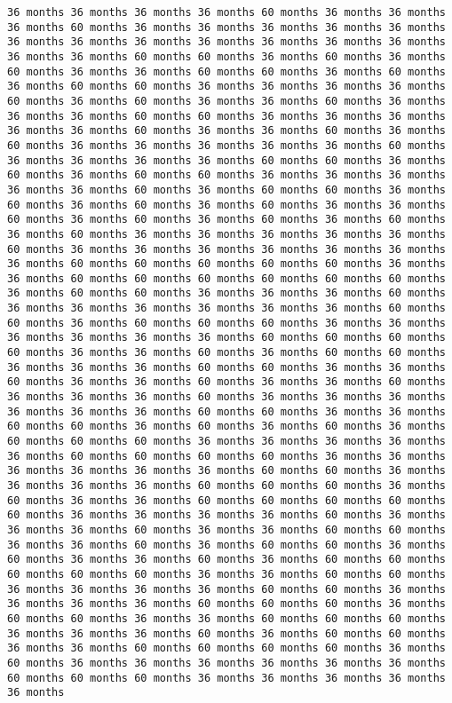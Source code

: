 \documentclass[11pt]{article}
\begin{document}
\begin{Verbatim}[commandchars=\\\{\}, frame=single, framerule=2mm, rulecolor=\color{outerrorbackground}]
36 months 36 months 36 months 36 months 60 months 36 months 36 months 36 months 60 months 36 months 36 months 36 months 36 months 36 months 36 months 36 months 36 months 36 months 36 months 36 months 36 months 36 months 36 months 60 months 60 months 36 months 60 months 36 months 60 months 36 months 36 months 60 months 60 months 36 months 60 months 36 months 60 months 60 months 36 months 36 months 36 months 36 months 60 months 36 months 60 months 36 months 36 months 60 months 36 months 36 months 36 months 60 months 60 months 36 months 36 months 36 months 36 months 36 months 60 months 36 months 36 months 60 months 36 months 60 months 36 months 36 months 36 months 36 months 36 months 60 months 36 months 36 months 36 months 36 months 60 months 60 months 36 months 60 months 36 months 60 months 60 months 36 months 36 months 36 months 36 months 36 months 60 months 36 months 60 months 60 months 36 months 60 months 36 months 60 months 36 months 60 months 36 months 36 months 60 months 36 months 60 months 36 months 60 months 36 months 60 months 36 months 60 months 36 months 36 months 36 months 36 months 36 months 60 months 36 months 36 months 36 months 36 months 36 months 36 months 36 months 60 months 60 months 60 months 60 months 60 months 36 months 36 months 60 months 60 months 60 months 60 months 60 months 60 months 36 months 60 months 60 months 36 months 36 months 36 months 60 months 36 months 36 months 36 months 36 months 36 months 36 months 60 months 60 months 36 months 60 months 60 months 60 months 36 months 36 months 36 months 36 months 36 months 36 months 60 months 60 months 60 months 60 months 36 months 36 months 60 months 36 months 60 months 60 months 36 months 36 months 36 months 60 months 60 months 36 months 36 months 60 months 36 months 36 months 60 months 36 months 36 months 60 months 36 months 36 months 36 months 60 months 36 months 36 months 36 months 36 months 36 months 36 months 60 months 60 months 36 months 36 months 60 months 60 months 36 months 60 months 36 months 60 months 36 months 60 months 60 months 60 months 36 months 36 months 36 months 36 months 36 months 60 months 60 months 60 months 60 months 36 months 36 months 36 months 36 months 36 months 36 months 60 months 60 months 36 months 36 months 36 months 36 months 60 months 60 months 60 months 36 months 60 months 36 months 36 months 60 months 60 months 60 months 60 months 60 months 36 months 36 months 36 months 36 months 60 months 36 months 36 months 36 months 60 months 36 months 36 months 60 months 60 months 36 months 36 months 60 months 36 months 60 months 60 months 36 months 60 months 36 months 36 months 60 months 36 months 60 months 60 months 60 months 60 months 60 months 36 months 36 months 60 months 60 months 36 months 36 months 36 months 36 months 60 months 60 months 36 months 36 months 36 months 36 months 60 months 60 months 60 months 36 months 60 months 60 months 36 months 36 months 60 months 60 months 60 months 36 months 36 months 36 months 60 months 36 months 60 months 60 months 36 months 36 months 60 months 60 months 60 months 60 months 36 months 60 months 36 months 36 months 36 months 36 months 36 months 36 months 60 months 60 months 60 months 36 months 36 months 36 months 36 months 36 months 
\end{Verbatim}
\end{document}
